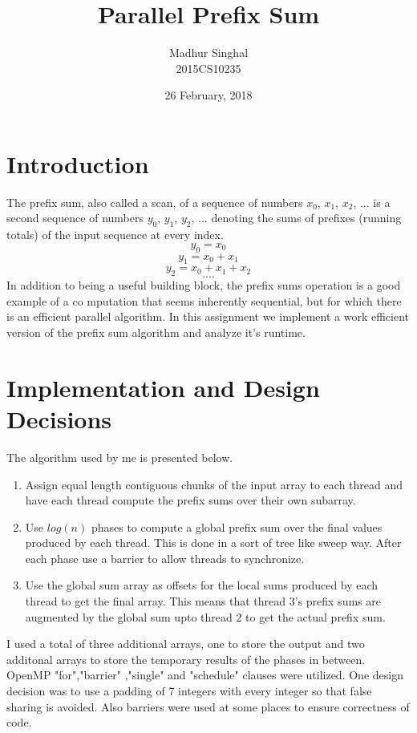 \documentclass[12pt,a4paper]{article}
\author{Madhur Singhal\\2015CS10235}
\title{Parallel Prefix Sum}
\date{26 February, 2018}
\begin{document}
\maketitle
\section{Introduction}
The prefix sum, also called a scan, of a sequence of numbers $x_0$, $x_1$, $x_2$, $...$ is a second sequence of numbers $y_0$, $y_1$, $y_2$, $...$ denoting the sums of prefixes (running totals) of the input sequence at every index.
$$ y_0 = x_0$$
$$ y_1 = x_0 +x_1$$
$$y_2 = x_0 + x_1 +x_2$$
$$ ....$$
In addition to being a useful building block, the prefix sums operation is a good example of a co mputation that
seems inherently sequential, but for which there is an efficient parallel algorithm. In this assignment we implement a work efficient version of the prefix sum algorithm and analyze it's runtime.
\section{Implementation and Design Decisions}
The algorithm used by me is presented below.
\begin{enumerate}
\item Assign equal length contiguous chunks of the input array to each thread and have each thread compute the prefix sums over their own subarray.
\item Use $log(n)$ phases to compute a global prefix sum over the final values produced by each thread. This is done in a sort of tree like sweep way. After each phase use a barrier to allow threads to synchronize.
\item Use the global sum array as offsets for the local sums produced by each thread to get the final array. This means that thread 3's prefix sums are augmented by the global sum upto thread 2 to get the actual prefix sum.
\end{enumerate}
I used a total of three additional arrays, one to store the output and two additonal arrays to store the temporary results of the phases in between. OpenMP "for","barrier" ,"single" and "schedule" clauses were utilized. One design decision was to use a padding of 7 integers with every integer so that false sharing is avoided. Also barriers were used at some places to ensure correctness of code.
\end{document}
